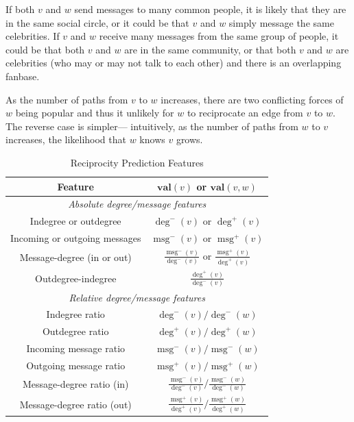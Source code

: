 \documentclass[conference]{IEEEtran}
\begin{document}
If both $v$ and $w$ send messages to many common people, it is likely that they are in the same social circle, or it could be that $v$ and $w$ simply message the same celebrities. 
If $v$ and $w$ receive many messages from the same group of people, it could be that both $v$ and $w$ are in the same community, or that both $v$ and $w$ are celebrities (who may or may not talk to each other) and there is an overlapping fanbase.

As the number of paths from $v$ to $w$ increases, there are two conflicting forces of $w$ being popular and thus it unlikely for $w$ to reciprocate an edge from $v$ to $w$. 
The reverse case is simpler--- intuitively, as the number of paths from $w$ to $v$ increases, the likelihood that $w$ knows $v$ grows.

\begin{table}[!t]
\renewcommand{\arraystretch}{1.3}
\caption{Reciprocity Prediction Features}
\label{table_recmethods}
\centering
\begin{tabular}{|c||c|}
\hline
\bf{Feature} & $\mathbf{val}(v)$ or $\mathbf{val}(v,w)$\\
\hline
\multicolumn{2}{|c|}{\emph{Absolute degree/message features}} \\
\hline
Indegree or outdegree & $\deg^-(v)$ or $\deg^+(v)$ \\
Incoming or outgoing messages & $\operatorname{msg}^-(v)$ or $\operatorname{msg}^+(v)$ \\
Message-degree (in or out) & $\frac{\operatorname{msg}^-(v)}{\deg^-(v)}$ or $\frac{\operatorname{msg}^+(v)}{\deg^+(v)}$ \\
Outdegree-indegree & $\frac{\deg^+(v)}{\deg^-(v)}$ \\
\hline
\multicolumn{2}{|c|}{\emph{Relative degree/message features}} \\
\hline
Indegree ratio & $\deg^-(v) / \deg^-(w)$ \\
Outdegree ratio & $\deg^+(v) / \deg^+(w)$ \\
\hline
Incoming message ratio & $\operatorname{msg}^-(v) / \operatorname{msg}^-(w)$ \\
Outgoing message ratio & $\operatorname{msg}^+(v) / \operatorname{msg}^+(w)$ \\
\hline
Message-degree ratio (in) & $\frac{\operatorname{msg}^-(v)}{\deg^-(v)} / \frac{\operatorname{msg}^-(w)}{\deg^-(w)}$ \\
Message-degree ratio (out) & $\frac{\operatorname{msg}^+(v)}{\deg^+(v)} / \frac{\operatorname{msg}^+(w)}{\deg^+(w)}$ \\

\end{tabular}
\end{table}
\end{document}
